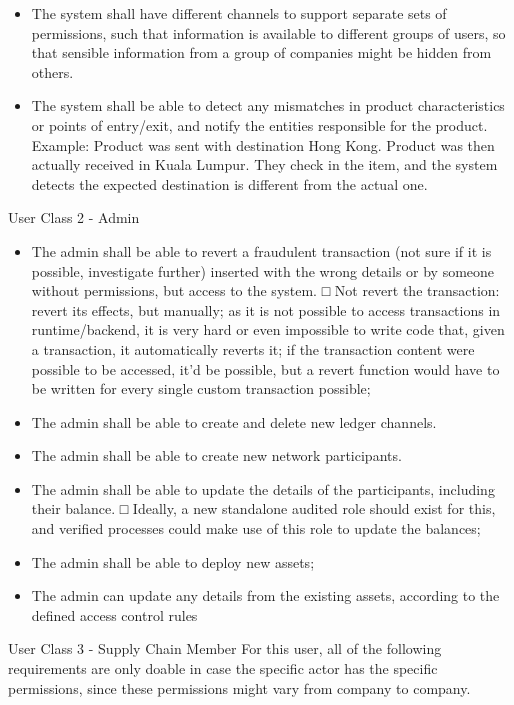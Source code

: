\begin{itemize}
\begin{itemize}
			\item The system shall have different channels to support separate sets of permissions, such that information is available to different groups of users, so that sensible information from a group of companies might be hidden from others.
			\item The system shall be able to detect any mismatches in product characteristics or points of entry/exit, and notify the entities responsible for the product.
			Example: Product was sent with destination Hong Kong. Product was then actually received in Kuala Lumpur. They check in the item, and the system detects the expected destination is different from the actual one.
        \end{itemize}
        \par User Class 2 - Admin
        \begin{itemize}
			\item The admin shall be able to revert a fraudulent transaction (not sure if it is possible, investigate further) inserted with the wrong details or by someone without permissions, but access to the system.
				□ Not revert the transaction: revert its effects, but manually; as it is not possible to access transactions in runtime/backend, it is very hard or even impossible to write code that, given a transaction, it automatically reverts it; if the transaction content were possible to be accessed, it'd be possible, but a revert function would have to be written for every single custom transaction possible;
			\item The admin shall be able to create and delete new ledger channels.
			\item The admin shall be able to create new network participants.
			\item The admin shall be able to update the details of the participants, including their balance.
				□ Ideally, a new standalone audited role should exist for this, and verified processes could make use of this role to update the balances;
			\item The admin shall be able to deploy new assets;
			\item The admin can update any details from the existing assets, according to the defined access control rules
		\end{itemize}
		\par User Class 3 - Supply Chain Member
        For this user, all of the following requirements are only doable in case the specific actor has the specific permissions, since these permissions might vary from company to company.
        

\end{itemize}
